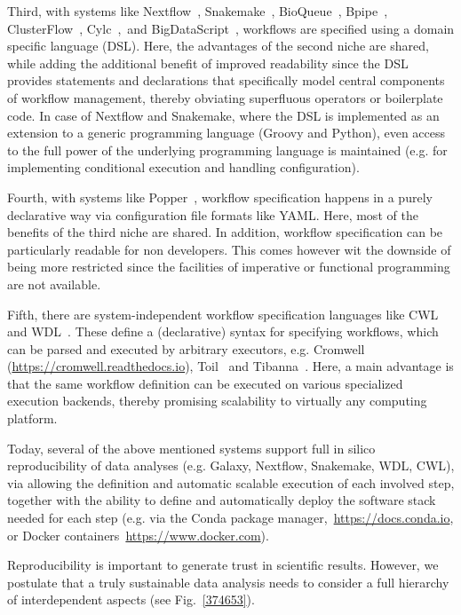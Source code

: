 \documentclass{scrartcl}
\begin{document}
Third, with systems like Nextflow~\cite{Di_Tommaso_2017},
Snakemake~\cite{Köster2012}, BioQueue~\cite{Yao2017},
Bpipe~\cite{Sadedin2012}, ClusterFlow~\cite{Ewels2016},
Cylc~\cite{J_Oliver_2018},~and BigDataScript~\cite{Cingolani_2014},
workflows are specified using a domain specific language (DSL). Here,
the advantages of the second niche are shared, while adding the
additional benefit of improved readability since the DSL provides
statements and declarations that specifically model central components
of workflow management, thereby obviating superfluous operators or
boilerplate code. In case of Nextflow and Snakemake, where the DSL is
implemented as an extension to a generic programming language (Groovy
and Python), even access to the full power of the underlying programming
language is maintained (e.g. for implementing conditional execution and
handling configuration).

Fourth, with systems like Popper~\cite{Jimenez_2017}, workflow
specification happens in a purely declarative way via configuration file
formats like YAML. Here, most of the benefits of the third niche are
shared. In addition, workflow specification can be particularly readable
for non developers. This comes however wit the downside of being more
restricted since the facilities of imperative or functional programming
are not available.

Fifth, there are system-independent workflow specification languages
like CWL~\cite{cwl} and WDL~\cite{voss_full-stack_2017}. These define a
(declarative) syntax for specifying workflows, which can be parsed and
executed by arbitrary executors, e.g. Cromwell
(\url{https://cromwell.readthedocs.io}), Toil~\cite{Vivian_2017} and
Tibanna~\cite{Lee_2019}. Here, a main advantage is that the same
workflow definition can be executed on various specialized execution
backends, thereby promising scalability to virtually any computing
platform.

Today, several of the above mentioned systems support full in silico
reproducibility of data analyses (e.g. Galaxy, Nextflow, Snakemake, WDL,
CWL), via allowing the definition and automatic scalable execution of
each involved step, together with the ability to define and
automatically deploy the software stack needed for each step (e.g. via
the Conda package manager,~\url{https://docs.conda.io}, or Docker
containers~\url{https://www.docker.com}).

Reproducibility is important to generate trust in scientific results.
However, we postulate that a truly sustainable data analysis needs to
consider a full hierarchy of interdependent aspects (see
Fig.~{\ref{374653}}).

\printbibliography
\end{document}
